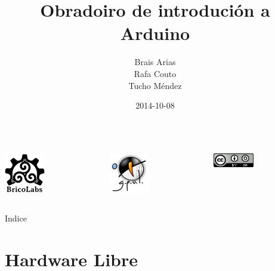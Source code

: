 \documentclass{beamer}
\title{Obradoiro de introdución a Arduino}
\author[Brais, Rafa, Tucho]{ Brais Arias \\ Rafa Couto \\ Tucho Méndez}
\date{2014-10-08}
\begin{document}
\begin{frame}
\titlepage
\begin{center}
\begin{columns}
\begin{column}{0.33\textwidth}
\begin{center}
\includegraphics[width=50pt]{./img/bricolabs.png}
\end{center}
\end{column}

\begin{column}{0.33\textwidth}
\begin{center}
\includegraphics[width=50pt]{./img/gpul.png}
\end{center}
\end{column}

\begin{column}{0.33\textwidth}
\begin{center}
\includegraphics[width=50pt]{./img/licencia.png}
\end{center}
\end{column}
\end{columns}
\end{center}
\end{frame}

\begin{frame}{Indice}
  \tableofcontents
\end{frame}

\section{Hardware Libre}
\begin{frame}
\huge{\centerline{\textbf{\color{blue} \insertsection}}}
\end{frame}
\end{document}
